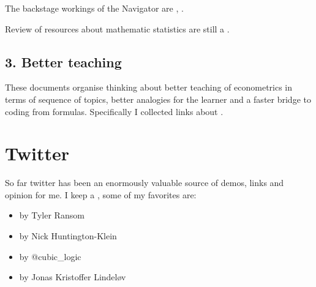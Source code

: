 \documentclass[letterpaper,10pt,english]{sphinxmanual}
\begin{document}
The backstage workings of the Navigator are ,
.

Review of resources about mathematic statistics are still a .


\subsection{3. Better teaching}
\label{\detokenize{index:better-teaching}}
These documents organise thinking about better teaching of
econometrics in terms of sequence of topics, better analogies
for the learner and a faster bridge to coding from formulas.
Specifically I collected links about .


\section{Twitter}
\label{\detokenize{index:twitter}}
So far twitter has been an enormously valuable source of demos, links and opinion for me.
I keep a , some of my favorites are:
\begin{itemize}
\item {} 
 by Tyler Ransom

\end{itemize}


\begin{itemize}
\item {} 
 by Nick Huntington-Klein

\end{itemize}


\begin{itemize}
\item {} 
 by @cubic\_logic

\end{itemize}


\begin{itemize}
\item {} 
 by Jonas Kristoffer Lindeløv

\end{itemize}
\end{document}
